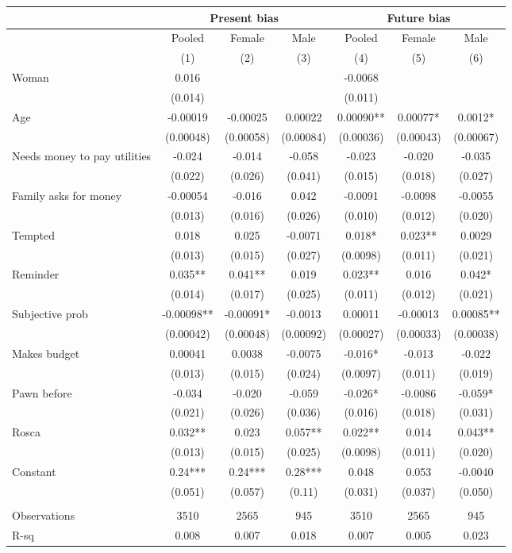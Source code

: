 \begin{tabular}{lcccccc}
\toprule
\multicolumn{1}{|r}{} & \multicolumn{3}{c}{Present bias} & \multicolumn{3}{c|}{Future bias} \\
\midrule
      & Pooled & Female & Male  & Pooled & Female & Male \\
\midrule
\midrule
      & (1)   & (2)   & (3)   & (4)   & (5)   & (6) \\
\midrule
\midrule
Woman & 0.016 &       &       & -0.0068 &       &  \\
      & (0.014) &       &       & (0.011) &       &  \\
Age   & -0.00019 & -0.00025 & 0.00022 & 0.00090** & 0.00077* & 0.0012* \\
      & (0.00048) & (0.00058) & (0.00084) & (0.00036) & (0.00043) & (0.00067) \\
Needs money to pay utilities & -0.024 & -0.014 & -0.058 & -0.023 & -0.020 & -0.035 \\
      & (0.022) & (0.026) & (0.041) & (0.015) & (0.018) & (0.027) \\
Family asks for money & -0.00054 & -0.016 & 0.042 & -0.0091 & -0.0098 & -0.0055 \\
      & (0.013) & (0.016) & (0.026) & (0.010) & (0.012) & (0.020) \\
Tempted & 0.018 & 0.025 & -0.0071 & 0.018* & 0.023** & 0.0029 \\
      & (0.013) & (0.015) & (0.027) & (0.0098) & (0.011) & (0.021) \\
Reminder & 0.035** & 0.041** & 0.019 & 0.023** & 0.016 & 0.042* \\
      & (0.014) & (0.017) & (0.025) & (0.011) & (0.012) & (0.021) \\
Subjective prob & -0.00098** & -0.00091* & -0.0013 & 0.00011 & -0.00013 & 0.00085** \\
      & (0.00042) & (0.00048) & (0.00092) & (0.00027) & (0.00033) & (0.00038) \\
Makes budget & 0.00041 & 0.0038 & -0.0075 & -0.016* & -0.013 & -0.022 \\
      & (0.013) & (0.015) & (0.024) & (0.0097) & (0.011) & (0.019) \\
Pawn before & -0.034 & -0.020 & -0.059 & -0.026* & -0.0086 & -0.059* \\
      & (0.021) & (0.026) & (0.036) & (0.016) & (0.018) & (0.031) \\
Rosca & 0.032** & 0.023 & 0.057** & 0.022** & 0.014 & 0.043** \\
      & (0.013) & (0.015) & (0.025) & (0.0098) & (0.011) & (0.020) \\
Constant  & 0.24*** & 0.24*** & 0.28*** & 0.048 & 0.053 & -0.0040 \\
      & (0.051) & (0.057) & (0.11) & (0.031) & (0.037) & (0.050) \\
\midrule
      &       &       &       &       &       &  \\
Observations & 3510  & 2565  & 945   & 3510  & 2565  & 945 \\
R-sq  & 0.008 & 0.007 & 0.018 & 0.007 & 0.005 & 0.023 \\
\bottomrule
\bottomrule
\end{tabular}%
